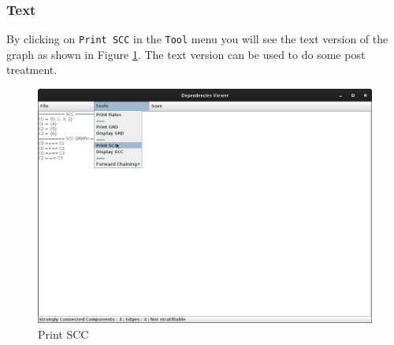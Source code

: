 \documentclass[a4paper, 10pt]{article}
\begin{document}
\subsubsection{Text}
By clicking on \verb=Print SCC= in the \verb=Tool= menu you will see the text version of the graph as shown in Figure \ref{fig7}. The text version can be used to do some post treatment.
\begin{figure}
\begin{center}
  \includegraphics[scale=0.25]{pics/fig7.png}
  \caption{Print SCC}
\end{center}
\label{fig7}
\end{figure}
\end{document}
